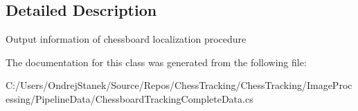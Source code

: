 \subsection{Detailed Description}
Output information of chessboard localization procedure 



The documentation for this class was generated from the following file\+:\begin{DoxyCompactItemize}
\item 
C\+:/\+Users/\+Ondrej\+Stanek/\+Source/\+Repos/\+Chess\+Tracking/\+Chess\+Tracking/\+Image\+Processing/\+Pipeline\+Data/Chessboard\+Tracking\+Complete\+Data.\+cs\end{DoxyCompactItemize}
